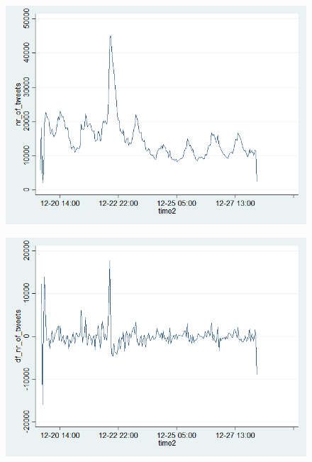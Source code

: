 \documentclass[a4paper,american,12pt]{article}
\begin{document}
\begin{spacing}{1.2}
	\begin{figure}[H]
	\graphicspath{ {stata_export_graphs/} }
	\includegraphics[scale=0.45]{graph_plot_nr_tweets.png}
	\end{figure}
	
	\begin{figure}[H]
	\graphicspath{ {stata_export_graphs/} }
	\includegraphics[scale=0.45]{graph_plot_df_nr_tweets.png}
	\end{figure}
	

\end{spacing}
\end{document}

